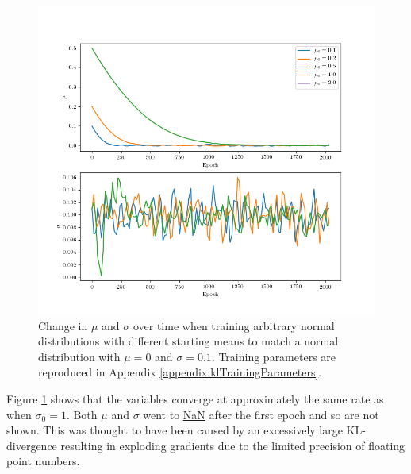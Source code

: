 \documentclass[../../main.tex]{subfiles}
\begin{document}
\begin{figure}[H]
    \begin{center}
    \includegraphics[width=\textwidth]{narrowKLDivergence}
    \caption{
        Change in $\mu$ and $\sigma$ over time when training arbitrary normal distributions with different starting means to match a normal distribution with $\mu=0$ and $\sigma=0.1$. 
        Training parameters are reproduced in Appendix \ref{appendix:klTrainingParameters}.
    }
    \label{fig:narrowKLDivergence}
    \end{center}
\end{figure}
Figure \ref{fig:narrowKLDivergence} shows that the variables converge at approximately the same rate as when $\sigma_0=1$.
Both $\mu$ and $\sigma$ went to \url{NaN} after the first epoch and so are not shown.
This was thought to have been caused by an excessively large KL-divergence resulting in exploding gradients due to the limited precision of floating point numbers.
\end{document}
